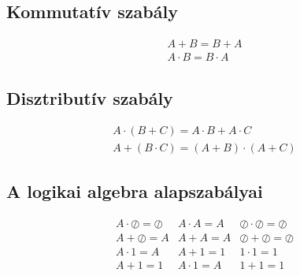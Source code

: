 \documentclass{article}
\begin{document}
\subsection{Kommutatív szabály}
\begin{align*}
    A + B = B + A \\
    A \cdot B = B \cdot A
\end{align*}

\subsection{Disztributív szabály}
\begin{align*}
    A \cdot (B + C) = A \cdot B + A \cdot C \\
    A + (B \cdot C) = (A + B) \cdot (A + C)
\end{align*}

\subsection{A logikai algebra alapszabályai}
\[\begin{array}{lll}
        A \cdot \oslash = \oslash & A \cdot A = A & \oslash \cdot \oslash = \oslash \\
        A + \oslash = A           & A + A = A     & \oslash + \oslash = \oslash     \\
        A \cdot 1 = A             & A + 1 = 1     & 1 \cdot 1 = 1                   \\
        A + 1 = 1                 & A \cdot 1 = A & 1 + 1 = 1                       \\
    \end{array}\]
\end{document}
